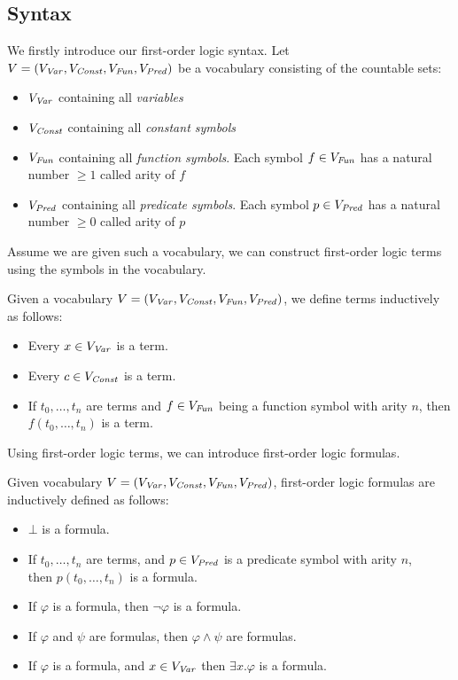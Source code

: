 \subsection{Syntax}
We firstly introduce our first-order logic syntax.
Let $V = (V_{\mathit{Var}}, V_{\mathit{Const}}, V_{\mathit{Fun}}, V_{\mathit{Pred}})$ be a vocabulary consisting of the countable sets:
\begin{itemize}
	\item $V_{\mathit{Var}}$ containing all \textsl{variables}
	\item $V_{\mathit{Const}}$ containing all \textsl{constant symbols}
	\item $V_{\mathit{Fun}} $ containing all \textsl{function symbols}. Each symbol $f \in V_{\mathit{Fun}}$ has a natural number $\geq 1$ called arity of $f$
 	\item $V_{\mathit{Pred}}$ containing all \textsl{predicate symbols}. Each symbol $p \in V_{\mathit{Pred}}$ has a natural number $\geq 0$ called arity of $p$
\end{itemize}
Assume we are given such a vocabulary, we can construct first-order logic terms using the symbols in the vocabulary.
\begin{mydef}[Term] 
	Given a vocabulary $V = (V_{\mathit{Var}}, V_{\mathit{Const}}, V_{\mathit{Fun}}, V_{\mathit{Pred}})$, we define terms inductively as follows:
	\begin{itemize}
		\item Every $x \in V_{\mathit{Var}}$ is a term.
		\item Every $c \in V_{\mathit{Const}}$ is a term.
		\item If $t_0, \ldots, t_n$ are terms and $f \in V_{\mathit{Fun}}$ being a function symbol with arity $n$, then $f(t_0, \ldots, t_n)$ is a term.
	\end{itemize}
\end{mydef}
Using first-order logic terms, we can introduce first-order logic formulas.
\begin{mydef}[Formula]
	Given vocabulary $V = (V_{\mathit{Var}}, V_{\mathit{Const}}, V_{\mathit{Fun}}, V_{\mathit{Pred}})$, first-order logic formulas are inductively defined as follows:
	\begin{itemize}
		\item $\bot$ is a formula.
		\item If  $t_0, \ldots, t_n$ are terms, and $p \in V_{\mathit{Pred}}$ is a predicate symbol with arity $n$, \\ then $p(t_0, \ldots, t_n)$ is a formula.
		\item If $\varphi$ is a formula, then $\neg \varphi$ is a formula.
		\item If $\varphi$ and $\psi$ are formulas, then $\varphi \land \psi$ are formulas.
		\item If $\varphi$ is a formula, and $x \in V_{\mathit{Var}}$ then $\exists x. \varphi$ is a formula.
	\end{itemize}
\end{mydef}
